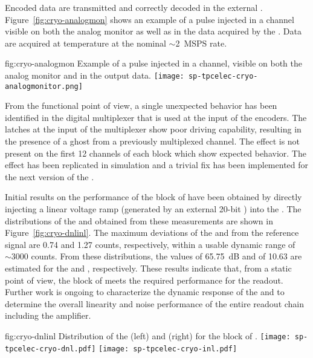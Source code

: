 Encoded data are transmitted and correctly decoded in the external . 
Figure~\ref{fig:cryo-analogmon} shows an example of a pulse injected in a channel 
visible on both the analog monitor as well as in the data acquired by the . 
Data are acquired at \lntwo temperature at the nominal $\sim$\SI{2}{MSPS} rate.

\begin{dunefigure}
{fig:cryo-analogmon}
{Example of a pulse injected in a   channel, visible on both the analog monitor and in the output data.}
\texttt{[image: sp-tpcelec-cryo-analogmonitor.png]}
\end{dunefigure}

From the functional point of view, a single unexpected behavior has been identified 
in the digital multiplexer that is used at the input of the encoders. The latches
at the input of the multiplexer show poor driving capability, resulting in the presence
of a ghost from a previously multiplexed channel. The effect is not present on the 
first 12 channels of each block which show expected behavior. The effect has been
replicated in simulation and a trivial fix has been implemented for 
the next version of the .

Initial results on the performance of the  block of  have
been obtained by directly injecting a linear voltage ramp (generated by an external
\num{20}-bit ) into the . The distributions of the 
and  obtained from these measurements are shown in Figure~\ref{fig:cryo-dnlinl}.
The maximum deviations of the  and  from the reference
signal are \num{0.74} and \num{1.27}  counts, respectively, within
a usable dynamic range of $\sim\num{3000}$  counts. From these
distributions, the values of \SI{65.75}{dB} and of \num{10.63} 
are estimated for the  and , respectively. These results indicate
that, from a static point of view, the  block of 
meets the required performance for the   readout.
Further work is ongoing to characterize the dynamic response of the
 and to determine the overall linearity and noise performance
of the entire readout chain including the  amplifier.

\begin{dunefigure}
{fig:cryo-dnlinl}
{Distribution of the  (left) and  (right) for the
 block of .}
\texttt{[image: sp-tpcelec-cryo-dnl.pdf]}
\texttt{[image: sp-tpcelec-cryo-inl.pdf]}
\end{dunefigure}


